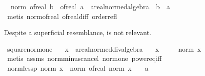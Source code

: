 \begin{isabellebody}
\ \ {\isachardoublequoteopen}norm\ {\isacharparenleft}{\kern0pt}of{\isacharunderscore}{\kern0pt}real\ b\ {\isacharminus}{\kern0pt}\ of{\isacharunderscore}{\kern0pt}real\ a\ {\isacharcolon}{\kern0pt}{\isacharcolon}{\kern0pt}\ {\isacharprime}{\kern0pt}a{\isacharcolon}{\kern0pt}{\isacharcolon}{\kern0pt}real{\isacharunderscore}{\kern0pt}normed{\isacharunderscore}{\kern0pt}algebra{\isacharunderscore}{\kern0pt}{}{\isacharparenright}{\kern0pt}\ {\isasymle}\ {\isasymbar}b\ {\isacharminus}{\kern0pt}\ a{\isasymbar}{\isachardoublequoteclose}\isanewline
%
\isadelimproof
\ \ %
\endisadelimproof
%
\isatagproof
{}\isamarkupfalse%
\ {\isacharparenleft}{\kern0pt}metis\ norm{\isacharunderscore}{\kern0pt}of{\isacharunderscore}{\kern0pt}real\ of{\isacharunderscore}{\kern0pt}real{\isacharunderscore}{\kern0pt}diff\ order{\isacharunderscore}{\kern0pt}refl{\isacharparenright}{\kern0pt}%
\endisatagproof
{\isafoldproof}%
%
\isadelimproof
%
\endisadelimproof
%
\begin{isamarkuptext}%
Despite a superficial resemblance,  is not relevant.%
\end{isamarkuptext}\isamarkuptrue%
\isamarkupfalse%
\ square{\isacharunderscore}{\kern0pt}norm{\isacharunderscore}{\kern0pt}one{\isacharcolon}{\kern0pt}\isanewline
\ \ \ x\ {\isacharcolon}{\kern0pt}{\isacharcolon}{\kern0pt}\ {\isachardoublequoteopen}{\isacharprime}{\kern0pt}a{\isacharcolon}{\kern0pt}{\isacharcolon}{\kern0pt}real{\isacharunderscore}{\kern0pt}normed{\isacharunderscore}{\kern0pt}div{\isacharunderscore}{\kern0pt}algebra{\isachardoublequoteclose}\isanewline
\ \ \ {\isachardoublequoteopen}x\ {\isacharequal}{\kern0pt}\ {}{\isachardoublequoteclose}\isanewline
\ \ \ {\isachardoublequoteopen}norm\ x\ {\isacharequal}{\kern0pt}\ {}{\isachardoublequoteclose}\isanewline
%
\isadelimproof
\ \ %
\endisadelimproof
%
\isatagproof
{}\isamarkupfalse%
\ {\isacharparenleft}{\kern0pt}metis\ assms\ norm{\isacharunderscore}{\kern0pt}minus{\isacharunderscore}{\kern0pt}cancel\ norm{\isacharunderscore}{\kern0pt}one\ power{}{\isacharunderscore}{\kern0pt}eq{\isacharunderscore}{\kern0pt}{}{\isacharunderscore}{\kern0pt}iff{\isacharparenright}{\kern0pt}%
\endisatagproof
{\isafoldproof}%
%
\isadelimproof
\isanewline
%
\endisadelimproof
\isanewline
{}\isamarkupfalse%
\ norm{\isacharunderscore}{\kern0pt}less{\isacharunderscore}{\kern0pt}p{}{\isacharcolon}{\kern0pt}\ {\isachardoublequoteopen}norm\ x\ {\isacharless}{\kern0pt}\ norm\ {\isacharparenleft}{\kern0pt}of{\isacharunderscore}{\kern0pt}real\ {\isacharparenleft}{\kern0pt}norm\ x{\isacharparenright}{\kern0pt}\ {\isacharplus}{\kern0pt}\ {}\ {\isacharcolon}{\kern0pt}{\isacharcolon}{\kern0pt}\ {\isacharprime}{\kern0pt}a{\isacharparenright}{\kern0pt}{\isachardoublequoteclose}\isanewline

\end{isabellebody}

